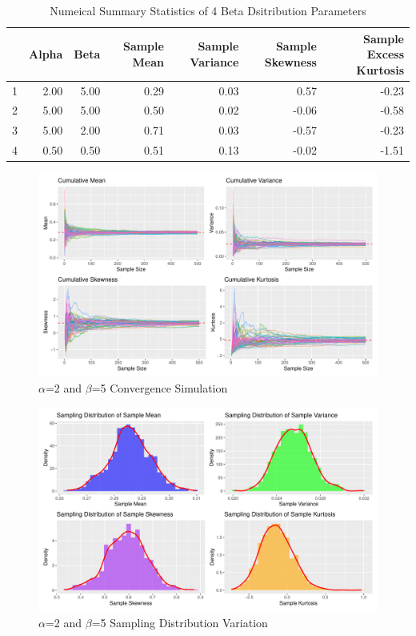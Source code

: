 \documentclass{article}\usepackage[]{graphicx}\usepackage[]{xcolor}
\begin{document}
\begin{table}[ht]
\centering
\caption{Numeical Summary Statistics of 4 Beta Dsitribution Parameters}
\label{table2}
\begin{tabular}{rrrrrrr}
  \hline
 & Alpha & Beta & Sample Mean & Sample Variance & Sample Skewness & Sample Excess Kurtosis \\ 
  \hline
1 & 2.00 & 5.00 & 0.29 & 0.03 & 0.57 & -0.23 \\ 
  2 & 5.00 & 5.00 & 0.50 & 0.02 & -0.06 & -0.58 \\ 
  3 & 5.00 & 2.00 & 0.71 & 0.03 & -0.57 & -0.23 \\ 
  4 & 0.50 & 0.50 & 0.51 & 0.13 & -0.02 & -1.51 \\ 
   \hline
\end{tabular}
\end{table}

\begin{figure}[ht]
  \begin{center}
  \includegraphics[width=\textwidth]{convergence.plots.pdf}
  \caption{$\alpha$=2 and $\beta$=5 Convergence Simulation}
  \label{plot2}
  \end{center}
\end{figure}

\begin{figure}[ht]
  \begin{center}
  \includegraphics[width=\textwidth]{variation.distributions.pdf}
  \caption{$\alpha$=2 and $\beta$=5 Sampling Distribution Variation}
  \label{plot3}
  \end{center}
\end{figure}
\end{document}
